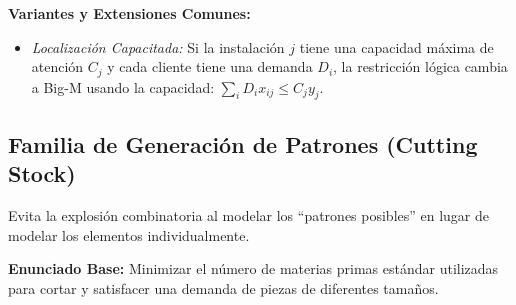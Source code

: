 \documentclass{article}
\begin{document}
	\textbf{Variantes y Extensiones Comunes:}
	\begin{itemize}
		\item \textit{Localización Capacitada:} Si la instalación $j$ tiene una capacidad máxima de atención $C_j$ y cada cliente tiene una demanda $D_i$, la restricción lógica cambia a Big-M usando la capacidad: $\sum_{i} D_i x_{ij} \leq C_j y_j$.
	\end{itemize}
	
	\newpage
	
	\subsection{Familia de Generación de Patrones (Cutting Stock)}
	Evita la explosión combinatoria al modelar los ``patrones posibles'' en lugar de modelar los elementos individualmente.
	
	\textbf{Enunciado Base:} Minimizar el número de materias primas estándar utilizadas para cortar y satisfacer una demanda de piezas de diferentes tamaños.
	
\end{document}
